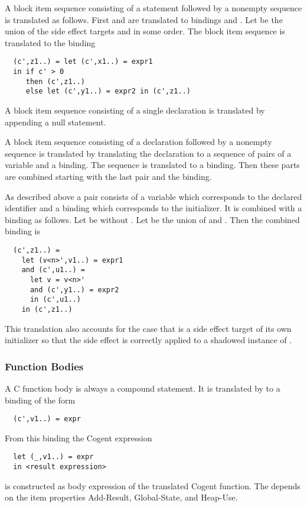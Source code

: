 A block item sequence consisting of a statement  followed by a nonempty sequence  is translated as follows. First
 and  are translated 
to bindings  and . Let  be the union of the side effect targets 
 and  in some order. The block item sequence is translated to the binding
\begin{verbatim}
  (c',z1..) = let (c',x1..) = expr1
  in if c' > 0
     then (c',z1..)
     else let (c',y1..) = expr2 in (c',z1..)
\end{verbatim}

A block item sequence consisting of a single declaration is translated by appending a null statement.

A block item sequence consisting of a declaration  followed by a nonempty sequence  is translated by translating 
the declaration to a sequence of pairs of a variable and a binding. The sequence  is translated to a binding. Then 
these parts are combined starting with the last pair and the binding.

As described above a pair consists of a variable  which corresponds to the declared identifier and a binding 
 which corresponds to the initializer. It is combined with a binding  as follows. 
Let  be  without . Let  be the union of  and . Then the
combined binding is
\begin{verbatim}
  (c',z1..) = 
    let (v<n>',v1..) = expr1
    and (c',u1..) = 
      let v = v<n>'
      and (c',y1..) = expr2
      in (c',u1..)
    in (c',z1..)
\end{verbatim}
This translation also accounts for the case that  is a side effect target of its own initializer so that the side effect is
correctly applied to a shadowed instance of .

\subsubsection{Function Bodies}

A C function body is always a compound statement. It is translated by  to a 
binding of the form
\begin{verbatim}
  (c',v1..) = expr
\end{verbatim}

From this binding the Cogent expression
\begin{verbatim}
  let (_,v1..) = expr
  in <result expression>
\end{verbatim}
is constructed as body expression of the translated Cogent function. The  depends on the item properties 
Add-Result, Global-State, and Heap-Use.

